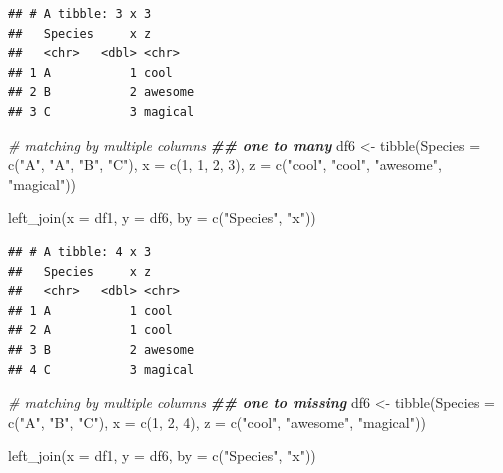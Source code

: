 \documentclass[
]{article}
\newenvironment{Shaded}{\begin{snugshade}}{\end{snugshade}}
\newcommand{\AttributeTok}[1]{\textcolor[rgb]{0.77,0.63,0.00}{#1}}
\newcommand{\CommentTok}[1]{\textcolor[rgb]{0.56,0.35,0.01}{\textit{#1}}}
\newcommand{\DecValTok}[1]{\textcolor[rgb]{0.00,0.00,0.81}{#1}}
\newcommand{\DocumentationTok}[1]{\textcolor[rgb]{0.56,0.35,0.01}{\textbf{\textit{#1}}}}
\newcommand{\FunctionTok}[1]{\textcolor[rgb]{0.00,0.00,0.00}{#1}}
\newcommand{\NormalTok}[1]{#1}
\newcommand{\OtherTok}[1]{\textcolor[rgb]{0.56,0.35,0.01}{#1}}
\newcommand{\StringTok}[1]{\textcolor[rgb]{0.31,0.60,0.02}{#1}}
\begin{document}
\begin{verbatim}
## # A tibble: 3 x 3
##   Species     x z      
##   <chr>   <dbl> <chr>  
## 1 A           1 cool   
## 2 B           2 awesome
## 3 C           3 magical
\end{verbatim}

\begin{Shaded}
\begin{Highlighting}[]
\CommentTok{\# matching by multiple columns}
\DocumentationTok{\#\# one to many}
\NormalTok{df6 }\OtherTok{\textless{}{-}} \FunctionTok{tibble}\NormalTok{(}\AttributeTok{Species =} \FunctionTok{c}\NormalTok{(}\StringTok{"A"}\NormalTok{, }\StringTok{"A"}\NormalTok{, }\StringTok{"B"}\NormalTok{, }\StringTok{"C"}\NormalTok{),}
              \AttributeTok{x =} \FunctionTok{c}\NormalTok{(}\DecValTok{1}\NormalTok{, }\DecValTok{1}\NormalTok{, }\DecValTok{2}\NormalTok{, }\DecValTok{3}\NormalTok{),}
              \AttributeTok{z =} \FunctionTok{c}\NormalTok{(}\StringTok{"cool"}\NormalTok{, }\StringTok{"cool"}\NormalTok{, }\StringTok{"awesome"}\NormalTok{, }\StringTok{"magical"}\NormalTok{))}

\FunctionTok{left\_join}\NormalTok{(}\AttributeTok{x =}\NormalTok{ df1,}
          \AttributeTok{y =}\NormalTok{ df6,}
          \AttributeTok{by =} \FunctionTok{c}\NormalTok{(}\StringTok{"Species"}\NormalTok{, }\StringTok{"x"}\NormalTok{))}
\end{Highlighting}
\end{Shaded}

\begin{verbatim}
## # A tibble: 4 x 3
##   Species     x z      
##   <chr>   <dbl> <chr>  
## 1 A           1 cool   
## 2 A           1 cool   
## 3 B           2 awesome
## 4 C           3 magical
\end{verbatim}

\begin{Shaded}
\begin{Highlighting}[]
\CommentTok{\# matching by multiple columns}
\DocumentationTok{\#\# one to missing}
\NormalTok{df6 }\OtherTok{\textless{}{-}} \FunctionTok{tibble}\NormalTok{(}\AttributeTok{Species =} \FunctionTok{c}\NormalTok{(}\StringTok{"A"}\NormalTok{, }\StringTok{"B"}\NormalTok{, }\StringTok{"C"}\NormalTok{),}
              \AttributeTok{x =} \FunctionTok{c}\NormalTok{(}\DecValTok{1}\NormalTok{, }\DecValTok{2}\NormalTok{, }\DecValTok{4}\NormalTok{),}
              \AttributeTok{z =} \FunctionTok{c}\NormalTok{(}\StringTok{"cool"}\NormalTok{, }\StringTok{"awesome"}\NormalTok{, }\StringTok{"magical"}\NormalTok{))}

\FunctionTok{left\_join}\NormalTok{(}\AttributeTok{x =}\NormalTok{ df1,}
          \AttributeTok{y =}\NormalTok{ df6,}
          \AttributeTok{by =} \FunctionTok{c}\NormalTok{(}\StringTok{"Species"}\NormalTok{, }\StringTok{"x"}\NormalTok{))}
\end{Highlighting}
\end{Shaded}
\end{document}
